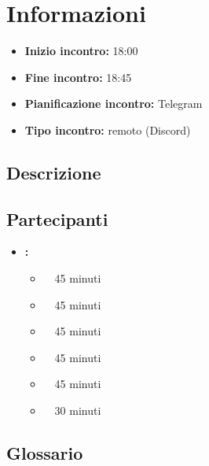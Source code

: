 \section{Informazioni}
\begin{itemize}
	\item \textbf{Inizio incontro:} 18:00
	\item \textbf{Fine incontro:} 18:45
	\item \textbf{Pianificazione incontro:} Telegram
	\item \textbf{Tipo incontro:} remoto (Discord)
\end{itemize}

\subsection{Descrizione}
\DocDescription

\subsection{Partecipanti}

\begin{itemize}
	\item \textbf{\GroupName:}
	\begin{itemize}
		\item \tommaso \ \rightarrow\ 45 minuti
		\item \marco \ \rightarrow\ 45 minuti
		\item \sebastiano \ \rightarrow\ 45 minuti
		\item \martina \ \rightarrow\ 45 minuti
		\item \riccardo \ \rightarrow\ 45 minuti
		\item \mattia \ \rightarrow\ 30 minuti
	\end{itemize}
\end{itemize}

\subsection{Glossario}
\GlossarioIntroduzione

\clearpage
